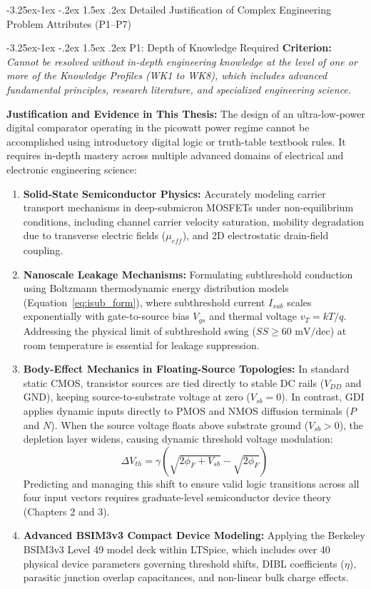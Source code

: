 \documentclass[12pt,a4paper,oneside]{report}
\makeatletter
\renewcommand\subsection{\@startsection{subsection}{2}{\z@}%
                                     {-3.25ex\@plus -1ex \@minus -.2ex}%
                                     {1.5ex \@plus .2ex}%
                                     {\normalfont\normalsize\bfseries\itshape}}
\renewcommand\subsubsection{\@startsection{subsubsection}{3}{\z@}%
                                     {-3.25ex\@plus -1ex \@minus -.2ex}%
                                     {1.5ex \@plus .2ex}%
                                     {\normalfont\normalsize\itshape}}
\makeatother
\begin{document}
\subsection{Detailed Justification of Complex Engineering Problem Attributes (P1--P7)}

\subsubsection{P1: Depth of Knowledge Required}
\textbf{Criterion:} \textit{Cannot be resolved without in-depth engineering knowledge at the level of one or more of the Knowledge Profiles (WK1 to WK8), which includes advanced fundamental principles, research literature, and specialized engineering science.}

\noindent\textbf{Justification and Evidence in This Thesis:}
The design of an ultra-low-power digital comparator operating in the picowatt power regime cannot be accomplished using introductory digital logic or truth-table textbook rules. It requires in-depth mastery across multiple advanced domains of electrical and electronic engineering science:
\begin{enumerate}
\item \textbf{Solid-State Semiconductor Physics:} Accurately modeling carrier transport mechanisms in deep-submicron MOSFETs under non-equilibrium conditions, including channel carrier velocity saturation, mobility degradation due to transverse electric fields ($\mu_{eff}$), and 2D electrostatic drain-field coupling.
\item \textbf{Nanoscale Leakage Mechanisms:} Formulating subthreshold conduction using Boltzmann thermodynamic energy distribution models (Equation~\ref{eq:isub_form}), where subthreshold current $I_{sub}$ scales exponentially with gate-to-source bias $V_{gs}$ and thermal voltage $v_T = kT/q$. Addressing the physical limit of subthreshold swing ($SS \ge 60\text{ mV/dec}$) at room temperature is essential for leakage suppression.
\item \textbf{Body-Effect Mechanics in Floating-Source Topologies:} In standard static CMOS, transistor sources are tied directly to stable DC rails ($V_{DD}$ and GND), keeping source-to-substrate voltage at zero ($V_{sb} = 0$). In contrast, GDI applies dynamic inputs directly to PMOS and NMOS diffusion terminals ($P$ and $N$). When the source voltage floats above substrate ground ($V_{sb} > 0$), the depletion layer widens, causing dynamic threshold voltage modulation:
\begin{equation}
\Delta V_{th} = \gamma \left(\sqrt{2\phi_F + V_{sb}} - \sqrt{2\phi_F}\right)
\end{equation}
Predicting and managing this shift to ensure valid logic transitions across all four input vectors requires graduate-level semiconductor device theory (Chapters 2 and 3).
\item \textbf{Advanced BSIM3v3 Compact Device Modeling:} Applying the Berkeley BSIM3v3 Level 49 model deck within LTSpice, which includes over 40 physical device parameters governing threshold shifts, DIBL coefficients ($\eta$), parasitic junction overlap capacitances, and non-linear bulk charge effects.
\end{enumerate}
\end{document}
